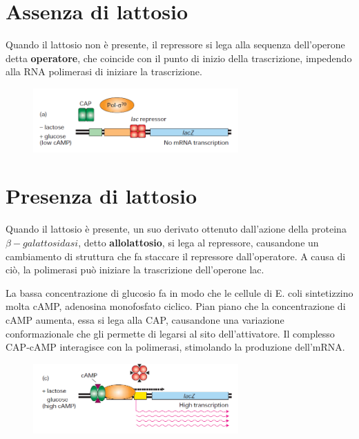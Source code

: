 \documentclass[10pt,a4paper]{article}
\begin{document}
	\section{Assenza di lattosio}
	
	Quando il lattosio non è presente, il repressore si lega alla sequenza dell'operone detta \textbf{operatore}, che coincide con il punto di inizio della trascrizione, impedendo alla RNA polimerasi di iniziare la trascrizione.
	
	\begin{figure}[h]
		\centering
		\includegraphics[width=0.7\textwidth]{operone no lac.png}	
	\end{figure}
	
	
	\section{Presenza di lattosio}
	
	Quando il lattosio è presente, un suo derivato ottenuto dall'azione della proteina $\beta-galattosidasi$, detto \textbf{allolattosio}, si lega al repressore, causandone un cambiamento di struttura che fa staccare il repressore dall'operatore. A causa di ciò, la polimerasi può iniziare la trascrizione dell'operone lac.
	
	La bassa concentrazione di glucosio fa in modo che le cellule di E. coli sintetizzino molta cAMP, adenosina monofosfato ciclico. Pian piano che la concentrazione di cAMP aumenta, essa si lega alla CAP, causandone una variazione conformazionale che gli permette di legarsi al sito dell'attivatore. Il complesso CAP-cAMP interagisce con la polimerasi, stimolando la produzione dell'mRNA.
	
		\begin{figure}[h]
		\centering
		\includegraphics[width=0.7\textwidth]{operone no glu.png}
	\end{figure}
	
\end{document}
